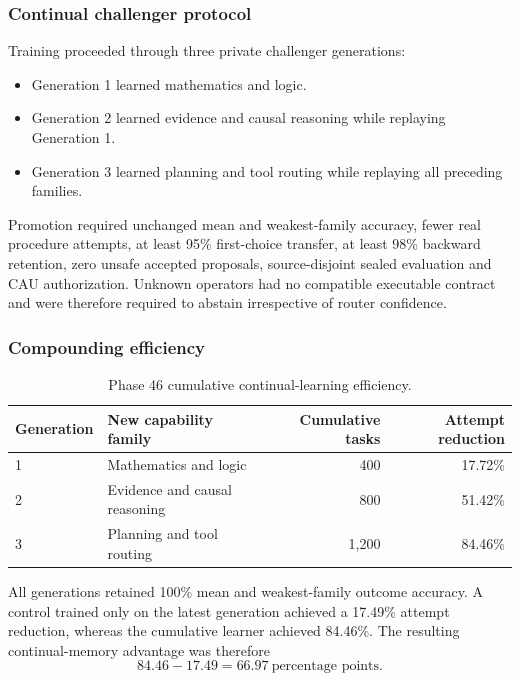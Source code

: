 \subsubsection{Continual challenger protocol}

Training proceeded through three private challenger generations:
\begin{itemize}
    \item Generation 1 learned mathematics and logic.
    \item Generation 2 learned evidence and causal reasoning while replaying
    Generation 1.
    \item Generation 3 learned planning and tool routing while replaying all
    preceding families.
\end{itemize}

Promotion required unchanged mean and weakest-family accuracy, fewer real
procedure attempts, at least 95\% first-choice transfer, at least 98\%
backward retention, zero unsafe accepted proposals, source-disjoint sealed
evaluation and CAU authorization.  Unknown operators had no compatible
executable contract and were therefore required to abstain irrespective of
router confidence.

\subsubsection{Compounding efficiency}

\begin{table}[htbp]
\centering
\begin{tabular}{llrr}
\hline
\textbf{Generation} & \textbf{New capability family}
& \textbf{Cumulative tasks} & \textbf{Attempt reduction}\\
\hline
1 & Mathematics and logic & 400 & 17.72\%\\
2 & Evidence and causal reasoning & 800 & 51.42\%\\
3 & Planning and tool routing & 1,200 & 84.46\%\\
\hline
\end{tabular}
\caption{Phase 46 cumulative continual-learning efficiency.}
\label{tab:phase46-generations}
\end{table}

All generations retained 100\% mean and weakest-family outcome accuracy.  A
control trained only on the latest generation achieved a 17.49\% attempt
reduction, whereas the cumulative learner achieved 84.46\%.  The resulting
continual-memory advantage was therefore
\[
84.46 - 17.49 = 66.97\ \text{percentage points}.
\]

